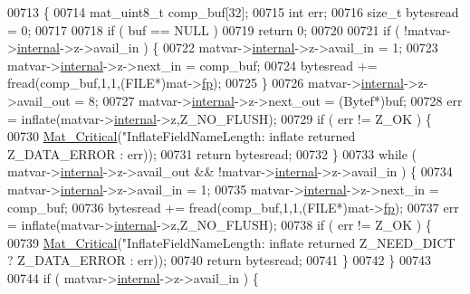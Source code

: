 \begin{DoxyCode}
{{{{{{{{{{{{{{{{{{{{{{00713 \{
00714     mat\_uint8\_t comp\_buf[32];
00715     \textcolor{keywordtype}{int}    err;
00716     \textcolor{keywordtype}{size\_t} bytesread = 0;
00717 
00718     \textcolor{keywordflow}{if} ( buf == NULL )
00719         \textcolor{keywordflow}{return} 0;
00720 
00721     \textcolor{keywordflow}{if} ( !matvar->\hyperlink{group___m_a_t_a6e97e3ed9f40c49322c18561c2a94e92}{internal}->z->avail\_in ) \{
00722         matvar->\hyperlink{group___m_a_t_a6e97e3ed9f40c49322c18561c2a94e92}{internal}->z->avail\_in = 1;
00723         matvar->\hyperlink{group___m_a_t_a6e97e3ed9f40c49322c18561c2a94e92}{internal}->z->next\_in = comp\_buf;
00724         bytesread += fread(comp\_buf,1,1,(FILE*)mat->\hyperlink{struct__mat__t_a85f562e407ca9ad4d2a6e14f839432b7}{fp});
00725     \}
00726     matvar->\hyperlink{group___m_a_t_a6e97e3ed9f40c49322c18561c2a94e92}{internal}->z->avail\_out = 8;
00727     matvar->\hyperlink{group___m_a_t_a6e97e3ed9f40c49322c18561c2a94e92}{internal}->z->next\_out = (Bytef*)buf;
00728     err = inflate(matvar->\hyperlink{group___m_a_t_a6e97e3ed9f40c49322c18561c2a94e92}{internal}->z,Z\_NO\_FLUSH);
00729     \textcolor{keywordflow}{if} ( err != Z\_OK ) \{
00730         \hyperlink{group__mat__util_gaf51f2bfbb5580f575e4dd79757e2b80c}{Mat\_Critical}(\textcolor{stringliteral}{"InflateFieldNameLength: inflate returned %
      Z\_DATA\_ERROR : err));
00731         \textcolor{keywordflow}{return} bytesread;
00732     \}
00733     \textcolor{keywordflow}{while} ( matvar->\hyperlink{group___m_a_t_a6e97e3ed9f40c49322c18561c2a94e92}{internal}->z->avail\_out && !matvar->\hyperlink{group___m_a_t_a6e97e3ed9f40c49322c18561c2a94e92}{internal}->z->avail\_in ) \{
00734         matvar->\hyperlink{group___m_a_t_a6e97e3ed9f40c49322c18561c2a94e92}{internal}->z->avail\_in = 1;
00735         matvar->\hyperlink{group___m_a_t_a6e97e3ed9f40c49322c18561c2a94e92}{internal}->z->next\_in = comp\_buf;
00736         bytesread += fread(comp\_buf,1,1,(FILE*)mat->\hyperlink{struct__mat__t_a85f562e407ca9ad4d2a6e14f839432b7}{fp});
00737         err = inflate(matvar->\hyperlink{group___m_a_t_a6e97e3ed9f40c49322c18561c2a94e92}{internal}->z,Z\_NO\_FLUSH);
00738         \textcolor{keywordflow}{if} ( err != Z\_OK ) \{
00739             \hyperlink{group__mat__util_gaf51f2bfbb5580f575e4dd79757e2b80c}{Mat\_Critical}(\textcolor{stringliteral}{"InflateFieldNameLength: inflate returned %
      Z\_NEED\_DICT ? Z\_DATA\_ERROR : err));
00740             \textcolor{keywordflow}{return} bytesread;
00741         \}
00742     \}
00743 
00744     \textcolor{keywordflow}{if} ( matvar->\hyperlink{group___m_a_t_a6e97e3ed9f40c49322c18561c2a94e92}{internal}->z->avail\_in ) \{
}}}}}}}}}}}}}}}}}}}}}}}}
\end{DoxyCode}
